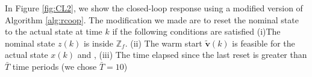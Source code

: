 \documentclass[10pt]{article}
\theoremstyle{definition}
\begin{document}
\begin{figure*}
\centering
\scriptsize
\resizebox{1\textwidth}{!}{}
\caption{(Left) Closed-loop response (Right) Warm start rendered
  infeasible for actual state because of disturbance}
\label{fig:CL1}
\end{figure*}


In Figure \ref{fig:CL2}, we show the closed-loop response using a
modified version of Algorithm \ref{alg:rcoop}. The modification we
made are to reset the nominal state to the actual state at time $k$ if the
following conditions are satisfied (i)The nominal state $z(k)$ is inside $\mathbb{Z}_f$.
(ii) The warm start $\tilde{\mathbf{v}}(k)$ is feasible for the
actual state $x(k)$ and , (iii) The time elapsed since the last reset
is greater than $\bar{T}$
time periods (we chose $\bar{T} = 10$)

\begin{figure*}
\centering
\scriptsize
\resizebox{1\textwidth}{!}{}
\caption{(Left) Closed-loop response. Notice that we reset the state
  around t = 15 (Right) Warm start rendered
  infeasible for actual state because of disturbance}
\label{fig:CL2}
\end{figure*}
\end{document}
